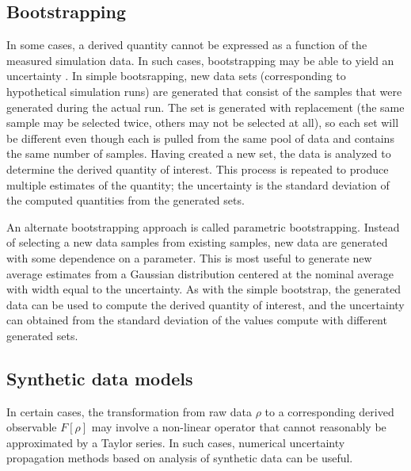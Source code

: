 
\subsection{Bootstrapping}

In some cases, a derived quantity cannot be expressed as a function of the measured simulation data.  In such cases, bootstrapping may be able to yield an uncertainty \cite{BOOTSTRAP}.  In simple bootsrapping, new data sets (corresponding to hypothetical simulation runs) are generated that consist of the samples that were generated during the actual run.  The set is generated with replacement (the same sample may be selected twice, others may not be selected at all), so each set will be different even though each is pulled from the same pool of data and contains the same number of samples.  Having created a new set, the data is analyzed to determine the derived quantity of interest.  This process is repeated to produce multiple estimates of the quantity; the uncertainty is the standard deviation of the computed quantities from the generated sets.

An alternate bootstrapping approach is called parametric bootstrapping.  Instead of selecting a new data samples from existing samples, new data are generated with some dependence on a parameter.  This is most useful to generate new average estimates from a Gaussian distribution centered at the nominal average with width equal to the uncertainty.  As with the simple bootstrap, the generated data can be used to compute the derived quantity of interest, and the uncertainty can obtained from the standard deviation of the values compute with different generated sets.

\subsection{Synthetic data models}
 
In certain cases, the transformation from raw data $\rho$ to a corresponding derived observable $F[\rho]$ may involve a non-linear operator that cannot reasonably be approximated by a Taylor series.  In such cases, numerical uncertainty propagation methods based on analysis of synthetic data can be useful.  

